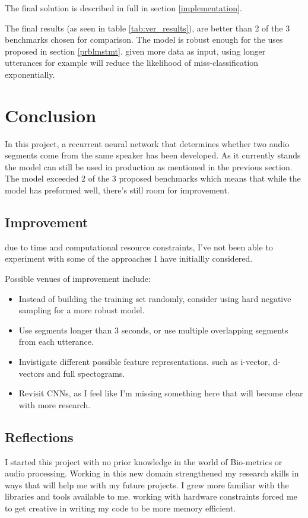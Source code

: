 \documentclass{article}
\begin{document}
The final solution is described in full in section \ref{implementation}.

The final results (as seen in table \ref{tab:ver_results}), are better than 2 of the 3 benchmarks chosen for comparison. The model is robust enough for the uses proposed in section \ref{prblmstmt}.
given more data as input, using longer utterances for example will reduce the likelihood of miss-classification exponentially.
\section{Conclusion}
In this project, a recurrent neural network that determines whether two audio segments come from the same speaker has been developed.  As it currently stands the model can still be used in production as mentioned in the previous section. The model exceeded 2 of the 3 proposed benchmarks which means that while the model has preformed well, there's still room for improvement.
\subsection{Improvement}
due to time and computational resource constraints, I've not been able to experiment with some of the approaches I have initiallly considered.

Possible venues of improvement include:
\begin{itemize}
    \item Instead of building the training set randomly, consider using hard negative sampling for a more robust model.
    \item Use segments longer than 3 seconds, or use multiple overlapping segments from each utterance.
    \item Invistigate different possible feature representations. such as i-vector, d-vectors and full spectograms.
    \item Revisit CNNs, as I feel like I'm missing something here that will become clear with more research.
\end{itemize}
\subsection{Reflections}
I started this project with no prior knowledge in the world of Bio-metrics or audio processing. Working in this new domain strengthened my research skills in ways that will help me with my future projects. I grew more familiar with the libraries and tools available to me. working with hardware constraints forced me to get creative in writing my code to be more memory efficient.
\pagebreak


\end{document}
